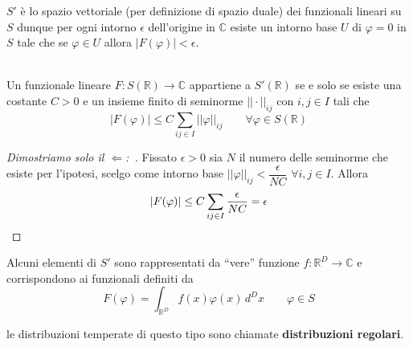 \documentclass[11pt,a4paper,twoside]{book}
\newenvironment{teorema}[1][\empty]{\begin{Teorema}{
\ifx\empty#1\relax\else\mdseries\itshape#1\\\fi
}{}}{\end{Teorema}}
\newenvironment{dimo}[1][\proofname]{
	\begin{tcolorbox}[
	breakable, 
	enhanced, 
	interior hidden, 
	frame hidden, 
	borderline west = {1pt}{0pt}{gray}, 
	top=0pt, bottom=0pt, left=0pt]
\begin{proof}[#1:~]
}
{
\end{proof}
\end{tcolorbox}
}
\theoremstyle{esss}
\theoremstyle{dotless}
\numberwithin{equation}{section} %
\begin{document}
$S'$ è lo spazio vettoriale (per definizione di spazio duale) dei funzionali lineari su $S$ dunque per ogni intorno $\epsilon$ dell'origine in $\mathbb{C}$ esiste un intorno base $U$ di $\varphi=0$ in $S$ tale che se $\varphi\in U$ allora $|F(\varphi)|<\epsilon$.

\begin{teorema}
Un funzionale lineare $F:S(\mathbb{R})\rightarrow\mathbb{C}$ appartiene a $S'(\mathbb{R})$ se e solo se esiste una costante $C>0$ e un insieme finito di seminorme $||\cdot||_{ij}$ con $i,j\in I$ tali che 
\[
\left|F(\varphi)\right|\leq C\sum_{ij\in I} ||\varphi||_{ij} \qquad \forall \varphi\in S(\mathbb{R})
\]
\end{teorema}

\begin{dimo}[Dimostriamo solo il $\Leftarrow$]
Fissato $\epsilon>0$ sia $N$ il numero delle seminorme che esiste per l'ipotesi, scelgo come intorno base $||\varphi||_{ij}<\dfrac{\epsilon}{NC}$ $\forall i,j\in I$. Allora 
\[
|F(\varphi)|\leq C\sum_{ij\in I} \dfrac{\epsilon}{NC}=\epsilon \qedhere
\]
\end{dimo}

Alcuni elementi di $S'$ sono rappresentati da ``vere'' funzione $f:\mathbb{R}^D\rightarrow\mathbb{C}$ e corrispondono ai funzionali definiti da
\[
F(\varphi)=\int_{\mathbb{R}^D} f(x)\varphi(x) \, d^Dx \qquad \varphi\in S
\]

le distribuzioni temperate di questo tipo sono chiamate \textbf{distribuzioni regolari}.
\end{document}
